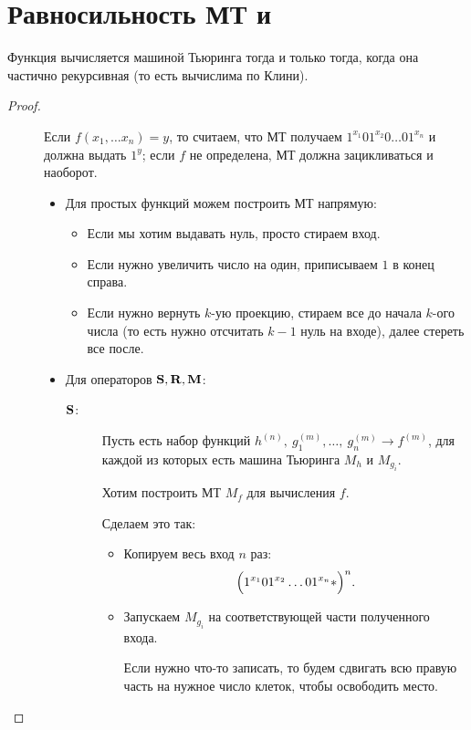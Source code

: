 \section{Равносильность МТ и \crf} 
\begin{thm}
	Функция вычисляется машиной Тьюринга тогда и только тогда, когда она частично рекурсивная (то есть вычислима по Клини).
\end{thm}
\begin{proof}
    \begin{description}
		\item[]
			Если $ f(x_1, \ldots x_n) = y$, то считаем, что МТ получаем $ 1^{x_1}01^{x_2}0\ldots 01^{x_n}$ и должна выдать $ 1^{y}$; если  $ f$ не определена, МТ должна зацикливаться и наоборот.
			\begin{itemize}
				\item Для простых функций можем построить МТ напрямую:
					\begin{itemize}
						\item Если мы хотим выдавать нуль, просто стираем вход.
						\item Если нужно увеличить число на один, приписываем $ 1$ в конец справа.
						\item Если нужно вернуть $ k$-ую проекцию, стираем все до начала $ k$-ого числа (то есть нужно отсчитать $ k-1$ нуль на входе), далее стереть все после.
					\end{itemize}
				\item Для операторов $ \S, \R, \M$:
					\begin{description}
						\item[$ \S$:]
							Пусть есть набор функций $ h^{(n)}, ~ g_1^{(m)}, \ldots , ~ g_n^{(m)} \longrightarrow f^{(m)}$, для каждой из которых есть машина Тьюринга $ M_{h}$ и $ M_{g_{i}}$. 

							Хотим построить МТ $ M_{f}$ для вычисления $ f$.

							Сделаем это так:
							\begin{itemize}
								\item Копируем весь вход $ n$ раз:
									\[
										\Bigl(1^{x_1}01^{x_2}\ldots 01^{x_n} \ast \Bigr)^{n}
									.\] 
								\item Запускаем $ M_{g_i}$ на соответствующей части полученного входа. 

							Если нужно что-то записать, то будем сдвигать всю правую часть на нужное число клеток, чтобы освободить место.


\end{itemize}
\end{description}
\end{itemize}
\end{description}
\end{proof}
